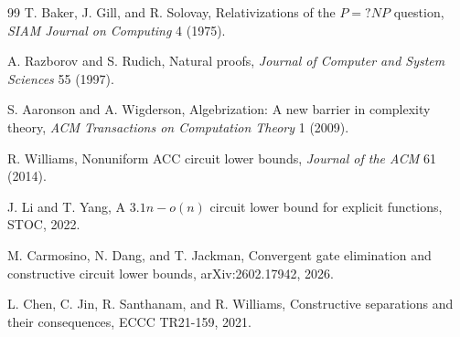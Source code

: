 \documentclass[11pt]{article}
\theoremstyle{definition}
\begin{document}
\begin{thebibliography}{99}
T. Baker, J. Gill, and R. Solovay,
Relativizations of the \(P=?NP\) question,
\emph{SIAM Journal on Computing} 4 (1975).

A. Razborov and S. Rudich,
Natural proofs,
\emph{Journal of Computer and System Sciences} 55 (1997).

S. Aaronson and A. Wigderson,
Algebrization: A new barrier in complexity theory,
\emph{ACM Transactions on Computation Theory} 1 (2009).

R. Williams,
Nonuniform ACC circuit lower bounds,
\emph{Journal of the ACM} 61 (2014).

J. Li and T. Yang,
A \(3.1n-o(n)\) circuit lower bound for explicit functions,
STOC, 2022.

M. Carmosino, N. Dang, and T. Jackman,
Convergent gate elimination and constructive circuit lower bounds,
arXiv:2602.17942, 2026.

L. Chen, C. Jin, R. Santhanam, and R. Williams,
Constructive separations and their consequences,
ECCC TR21-159, 2021.
\end{thebibliography}
\end{document}
